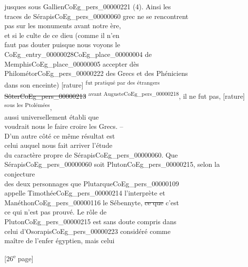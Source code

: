 \documentclass{book}
\begin{document}
{\begin{paracol}{2}
jusques sous Gallien\gls{CoEg_pers_00000221} (4). Ainsi les\\
traces de Sérapis\gls{CoEg_pers_00000060} grec ne se rencontrent\\
pas sur les monuments avant notre ère,\\
et si le culte de ce dieu (comme il n’en\\
faut pas douter puisque nous voyons le\\
\Gls{CoEg_entry_00000028}\gls{CoEg_place_00000004} de Memphis\gls{CoEg_place_00000005} accepter dès\\
Philométor\gls{CoEg_pers_00000222} des Grecs et des Phéniciens\\
dans son enceinte) [rature] \textsuperscript{fut pratiqué par des étrangers}\\
\sout{Sôter\gls{CoEg_pers_00000213}} \textsuperscript{avant Auguste\gls{CoEg_pers_00000218}}, il ne fut pas, [rature] \textsuperscript{sous les Ptolémées},\\
aussi universellement établi que\\
voudrait nous le faire croire les Grecs. –\\
D’un autre côté ce même résultat est\\
celui auquel nous fait arriver l’étude\\
du caractère propre de Sérapis\gls{CoEg_pers_00000060}. Que\\
Sérapis\gls{CoEg_pers_00000060} soit Pluton\gls{CoEg_pers_00000215}, selon la conjecture\\
des deux personnages que Plutarque\gls{CoEg_pers_00000109}\\
appelle Timothée\gls{CoEg_pers_00000214} l’interprète et\\
Manéthon\gls{CoEg_pers_00000116} le Sébennyte, \sout{ce que} c’est\\
ce qui n’est pas prouvé. Le rôle de\\
Pluton\gls{CoEg_pers_00000215} est sans doute compris dans\\
celui d’Osorapis\gls{CoEg_pers_00000223} considéré comme\\
maître de l’enfer égyptien, mais celui
\end{paracol}

{\footnotesize\begin{center} {[26\textsuperscript{e} page]}\end{center}}

}
\end{document}
